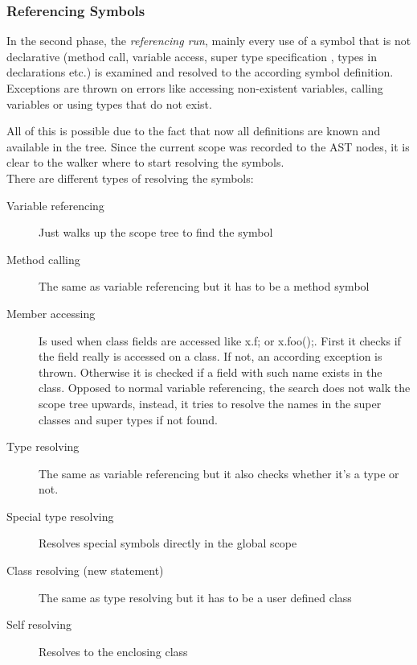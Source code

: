 \subsubsection{Referencing Symbols}
In the second phase, the \emph{referencing run}, mainly every use of a symbol 
that is not declarative (method call, variable access, super type specification
, types in declarations etc.) is examined and resolved to the according symbol 
definition.  Exceptions are thrown on errors like accessing non-existent 
variables, calling variables or using types that do not exist.

All of this is possible due to the fact that now all definitions are known 
and available in the tree. Since the current scope was recorded to the AST 
nodes, it is clear to the walker where to start resolving the symbols.\\


\noindent There are different types of resolving the symbols:
\begin{description}
\item[Variable referencing]
Just walks up the scope tree to find the symbol
\item[Method calling]
The same as variable referencing but it has to be a method symbol
\item[Member accessing]
Is used when class fields are accessed like x.f; or x.foo();. First it checks
if the field really is accessed on a class. If not, an according exception
is thrown. Otherwise it is checked if a field with such name exists
in the class. Opposed to normal variable referencing, the search does not walk
the scope tree upwards, instead, it tries to resolve the names in the super classes
and super types if not found.
\item[Type resolving]
The same as variable referencing but it also checks whether it's a type or not.
\item[Special type resolving]
Resolves special symbols directly in the global scope
\item[Class resolving (new statement)]
The same as type resolving but it has to be a user defined class
\item[Self resolving]
Resolves to the enclosing class
\end{description}

